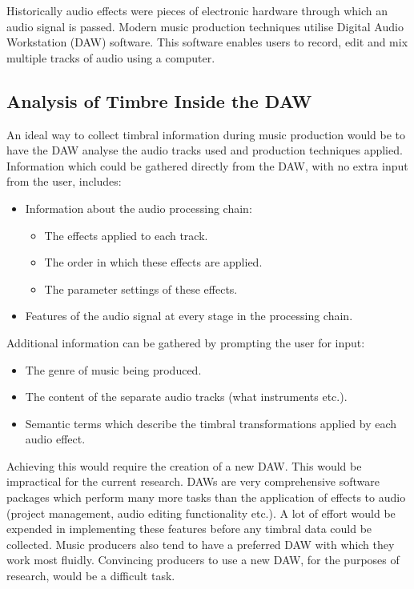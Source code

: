 		Historically audio effects were pieces of electronic hardware through which an audio signal is passed.
		Modern music production techniques utilise Digital Audio Workstation (DAW) software. This software enables
		users to record, edit and mix multiple tracks of audio using a computer. 
		
	\subsection{Analysis of Timbre Inside the DAW}
		An ideal way to collect timbral information during music production would be to have the DAW analyse the
		audio tracks used and production techniques applied. Information which could be gathered directly from the
		DAW, with no extra input from the user, includes:

		\begin{itemize}
			\item Information about the audio processing chain:
			\begin{itemize}
				\item The effects applied to each track.
				\item The order in which these effects are applied.
				\item The parameter settings of these effects.
			\end{itemize}

			\item Features of the audio signal at every stage in the processing chain.
		\end{itemize}

		Additional information can be gathered by prompting the user for input:

		\begin{itemize}
			\item The genre of music being produced.
			\item The content of the separate audio tracks (what instruments etc.).
			\item Semantic terms which describe the timbral transformations applied by each audio
			      effect.
		\end{itemize}

		Achieving this would require the creation of a new DAW. This would be impractical for the current research.
		DAWs are very comprehensive software packages which perform many more tasks than the application of effects
		to audio (project management, audio editing functionality etc.). A lot of effort would be expended in
		implementing these features before any timbral data could be collected.  Music producers also tend to have a
		preferred DAW with which they work most fluidly. Convincing producers to use a new DAW, for the purposes of
		research, would be a difficult task.

